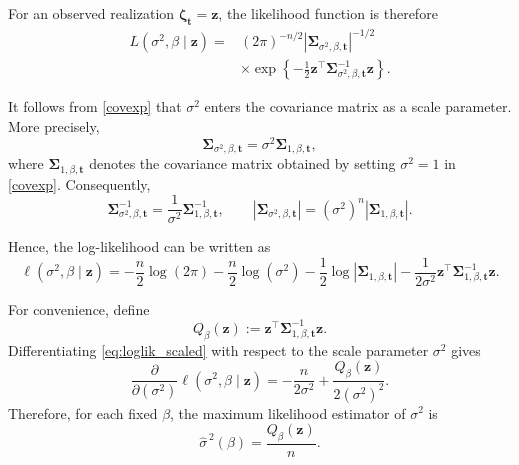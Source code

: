 \documentclass[preprint,12pt,authoryear]{elsarticle}
\begin{document}
For an observed realization
\(\bm\zeta_{\bm t}=\bm z\), the likelihood function is therefore
\begin{equation}\label{eq:likelihood_zeta}
\begin{aligned}
L(\sigma^2,\beta\mid\bm z)
={}&
(2\pi)^{-n/2}
\left|
\bm\Sigma_{\sigma^2,\beta,\bm t}
\right|^{-1/2} \\
&\times
\exp\!\left\{
-\frac12
\bm z^\top
\bm\Sigma_{\sigma^2,\beta,\bm t}^{-1}
\bm z
\right\}.
\end{aligned}
\end{equation}

It follows from \eqref{covexp} that \(\sigma^2\) enters the covariance
matrix as a scale parameter. More precisely,
\[
\bm\Sigma_{\sigma^2,\beta,\bm t}
=
\sigma^2
\bm\Sigma_{1,\beta,\bm t},
\]
where \(\bm\Sigma_{1,\beta,\bm t}\) denotes the covariance matrix
obtained by setting \(\sigma^2=1\) in \eqref{covexp}. Consequently,
\[
\bm\Sigma_{\sigma^2,\beta,\bm t}^{-1}
=
\frac{1}{\sigma^2}
\bm\Sigma_{1,\beta,\bm t}^{-1},
\qquad
\left|
\bm\Sigma_{\sigma^2,\beta,\bm t}
\right|
=
(\sigma^2)^n
\left|
\bm\Sigma_{1,\beta,\bm t}
\right|.
\]

Hence, the log-likelihood can be written as
\begin{equation}\label{eq:loglik_scaled}
\ell(\sigma^2,\beta\mid\bm z)
=
-\frac{n}{2}\log(2\pi)
-\frac{n}{2}\log(\sigma^2)
-\frac12
\log\left|
\bm\Sigma_{1,\beta,\bm t}
\right|
-\frac{1}{2\sigma^2}
\bm z^\top
\bm\Sigma_{1,\beta,\bm t}^{-1}
\bm z.
\end{equation}

For convenience, define
\[
Q_\beta(\bm z)
:=
\bm z^\top
\bm\Sigma_{1,\beta,\bm t}^{-1}
\bm z.
\]
Differentiating \eqref{eq:loglik_scaled} with respect to the scale
parameter \(\sigma^2\) gives
\begin{equation}\label{eq:dloglik_dsigma2}
\frac{\partial}{\partial(\sigma^2)}
\ell(\sigma^2,\beta\mid\bm z)
=
-\frac{n}{2\sigma^2}
+
\frac{Q_\beta(\bm z)}{2(\sigma^2)^2}.
\end{equation}
Therefore, for each fixed \(\beta\), the maximum likelihood estimator
of \(\sigma^2\) is
\begin{equation}\label{eq:sigmahat}
\widehat{\sigma}^{\,2}(\beta)
=
\frac{Q_\beta(\bm z)}{n}.
\end{equation}
\end{document}
